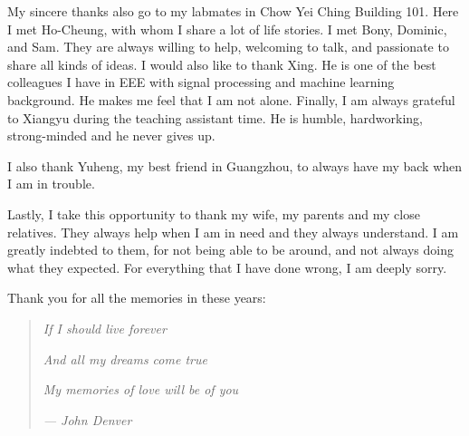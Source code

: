 \begin{acknowledgements}
My sincere thanks also go to my labmates in Chow Yei Ching Building 101. Here I met Ho-Cheung, with whom I share a lot of life stories. I met Bony, Dominic, and Sam. They are always willing to help, welcoming to talk, and passionate to share all kinds of ideas. I would also like to thank Xing. He is one of the best colleagues I have in EEE with signal processing and machine learning background. He makes me feel that I am not alone. Finally, I am always grateful to Xiangyu during the teaching assistant time. He is humble, hardworking, strong-minded and he never gives up.

I also thank Yuheng, my best friend in Guangzhou, to always have my back when I am in trouble.

Lastly, I take this opportunity to thank my wife, my parents and my close relatives. They always help when I am in need and they always understand. I am greatly indebted to them, for not being able to be around, and not always doing what they expected. For everything that I have done wrong, I am deeply sorry.

\newpage
Thank you for all the memories in these years:
\begin{quote}
\centering
\textit{If I should live forever}

\textit{And all my dreams come true}

\textit{My memories of love will be of you}

\textit{--- John Denver}
\end{quote}

\end{acknowledgements}




